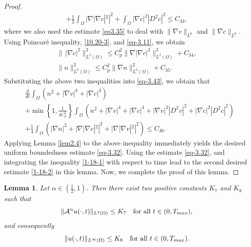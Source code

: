 \documentclass[10pt,a4paper]{amsart}
\numberwithin{equation}{section}
\newtheorem{lemma}[theo]{Lemma}
\begin{document}
\begin{proof}
\begin{equation}
\begin{aligned}
+ \frac{1}{2}\int_{\Omega} |\nabla |\nabla c|^2|^2
+ \int_{\Omega} |\nabla c|^2 |D^2 c|^2 \leq C_{33},
\end{aligned}
\end{equation}
where we also used the estimate \eqref{eq3.35} to deal with $\|\nabla v\|_{L^6}$ and 
$\|\nabla c\|_{L^6}$.
Using Poincar\'e inequality, \eqref{10.20-3}, and \eqref{eq-3.11}, we obtain
\begin{gather*}
\|\, |\nabla c|^2 \|_{L^2(\Omega)}^2 
\leq C^2_\mathrm{p} \| \nabla|\nabla c|^2 \|_{L^2(\Omega)}^2 +C_{34}, \\
\| n \|_{L^2(\Omega)}^2 \leq C^2_\mathrm{p} \| \nabla n \|_{L^2(\Omega)}^2 +C_{35}.
\end{gather*}
Substituting the above two inequalities into \eqref{eq-3.43}, we obtain that
\begin{equation}\label{1-18-1}
\begin{aligned}
&\frac{d}{dt} \int_{\Omega} \left( n^2 + |\nabla v|^4 + |\nabla c|^4\right)
\\
&+ \min\left\{1,\frac{1}{4C^2_\mathrm{p}} \right\} \int_{\Omega} \left( n^2
 + |\nabla v|^4 + |\nabla c|^4 + |\nabla v|^2 |D^2 v|^2
 + |\nabla c|^2 |D^2 c|^2\right)\\
&+\frac{1}{4}\int_{\Omega}\left(|\nabla n|^2+|\nabla |\nabla c|^2|^2
 +|\nabla |\nabla v|^2|^2\right)\leq C_{36}.
\end{aligned}
\end{equation}
Applying Lemma \ref{lem2.4} to the above inequality immediately yields the desired 
uniform boundedness estimate \eqref{eq-3.32}.
Using the estimate \eqref{eq-3.32}, and  integrating the inequality \eqref{1-18-1} 
with respect to time  lead to the second desired estimate \eqref{1-18-2} in this lemma.
Now, we complete the proof of this lemma.
\end{proof}

\begin{lemma}\label{lem3.7}
Let $ \alpha \in (\frac{1}{2}, 1) $. Then there exist two positive constants $K_7$ 
and $K_8$ such that
\begin{equation}\label{3.60}
\|\mathcal{A}^\alpha u(\cdot, t) \|_{L^2(\Omega)} \leq K_7 \quad 
\text{for all } t \in (0, T_{\rm max}),
\end{equation}
and consequently
\begin{equation}\label{3.61}
\| u(\cdot, t) \|_{L^\infty(\Omega)} \leq K_8 \quad 
\text{for all } t \in (0, T_{\rm max}).
\end{equation}
\end{lemma}
\end{document}
